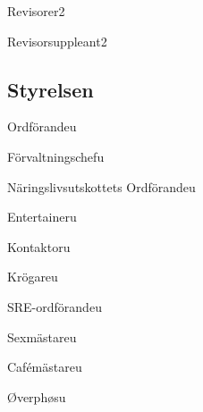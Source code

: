 \documentclass[10pt]{article}
\begin{document}
\begin{vallista}
    \begin{post}{Revisorer}{2}
        \vakant
        \vakant
    \end{post}
    \begin{post}{Revisorsuppleant}{2}
        \vakant
        \vakant
    \end{post}
\end{vallista}

\subsection{Styrelsen}

\begin{vallista}
    \begin{post}{Ordförande}{u}
    \end{post}
    \begin{post}{Förvaltningschef}{u}
    \end{post}
    \begin{post}{Näringslivsutskottets Ordförande}{u}
    \end{post}
    \begin{post}{Entertainer}{u}
    \end{post}
    \begin{post}{Kontaktor}{u}
    \end{post}
    \begin{post}{Krögare}{u}
    \end{post}
    \begin{post}{SRE-ordförande}{u}
    \end{post}
    \begin{post}{Sexmästare}{u}
    \end{post}
    \begin{post}{Cafémästare}{u}
    \end{post}
    \begin{post}{Øverphøs}{u}
    \end{post}
\end{vallista}
\end{document}
